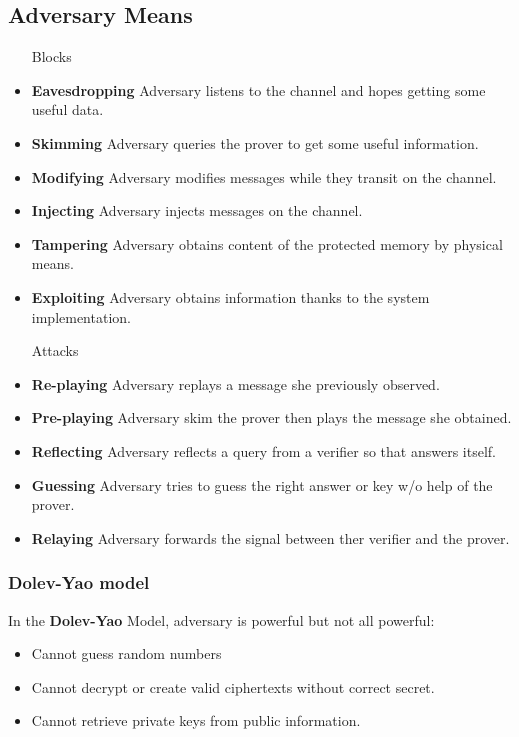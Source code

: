 \subsection{Adversary Means}
\begin{itemize}
    \item[Blocks]
\item\textbf{Eavesdropping} Adversary listens to the channel and hopes getting some
        useful data.
    \item\textbf{Skimming} Adversary queries the prover to get some useful information.
    \item\textbf{Modifying} Adversary modifies messages while they transit on the
        channel.
    \item\textbf{Injecting} Adversary injects messages on the channel.
    \item\textbf{Tampering} Adversary obtains content of the protected memory by
        physical means.
    \item\textbf{Exploiting} Adversary obtains information thanks to the system
        implementation.

    \item[Attacks]
    \item\textbf{Re-playing} Adversary replays a message she previously observed.
    \item\textbf{Pre-playing} Adversary skim the prover then plays the message she obtained.
    \item\textbf{Reflecting} Adversary reflects a query from a verifier so that
        answers itself.
    \item\textbf{Guessing} Adversary tries to guess the right answer or key w/o help of
        the prover.
    \item\textbf{Relaying} Adversary forwards the signal between ther verifier and the
        prover.
\end{itemize}

\subsubsection{Dolev-Yao model}
In the \textbf{Dolev-Yao} Model, adversary
is powerful but not all powerful: 
\begin{itemize}
    \item Cannot guess random numbers
    \item Cannot decrypt or create valid ciphertexts without correct secret.
    \item Cannot retrieve private keys from public information.
\end{itemize}

